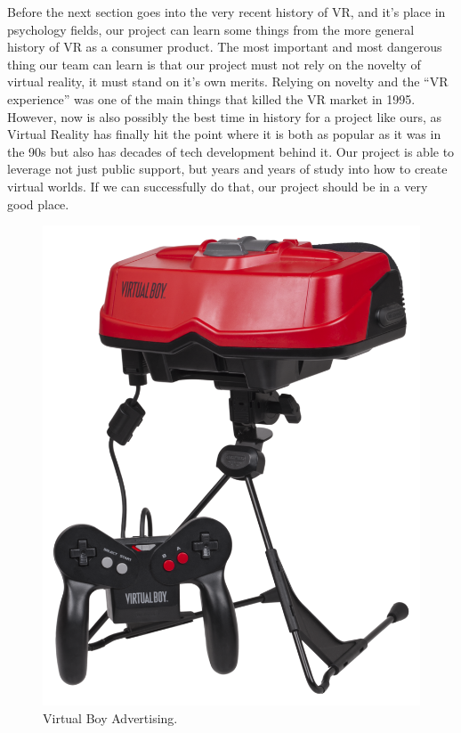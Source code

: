 \documentclass[a4paper,10pt]{article}
\begin{document}
	Before the next section goes into the very recent history of VR, and it’s place in psychology fields, our project can learn some things from the more general history of VR as a consumer product.  The most important and most dangerous thing our team can learn is that our project must not rely on the novelty of virtual reality, it must stand on it’s own merits.  Relying on novelty and the “VR experience” was one of the main things that killed the VR market in 1995.  However, now is also possibly the best time in history for a project like ours, as Virtual Reality has finally hit the point where it is both as popular as it was in the 90s but also has decades of tech development behind it.  Our project is able to leverage not just public support, but years and years of study into how to create virtual worlds.  If we can successfully do that, our project should be in a very good place.
		\begin{figure}[H]
			\centerline{\includegraphics[scale=0.7]{virtualBoy.png}}
			\caption{Virtual Boy Advertising.}
			\label{fig:vBoy}
		\end{figure}
\end{document}
